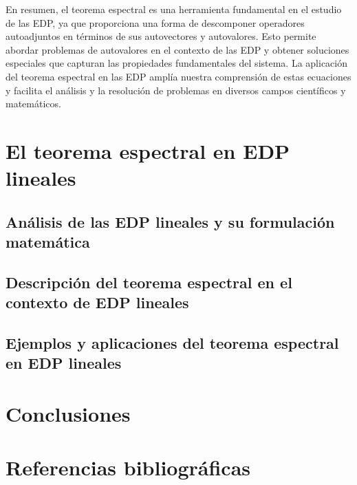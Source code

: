 \documentclass{article}
\begin{document}
    En resumen, el teorema espectral es una herramienta fundamental en el estudio de las EDP, ya que proporciona una forma de descomponer operadores autoadjuntos en términos de sus autovectores y autovalores. Esto permite abordar problemas de autovalores en el contexto de las EDP y obtener soluciones especiales que capturan las propiedades fundamentales del sistema. La aplicación del teorema espectral en las EDP amplía nuestra comprensión de estas ecuaciones y facilita el análisis y la resolución de problemas en diversos campos científicos y matemáticos.


\newpage

\section{El teorema espectral en EDP lineales}
    \subsection{Análisis de las EDP lineales y su formulación matemática}
    \subsection{Descripción del teorema espectral en el contexto de EDP lineales}
    \subsection{Ejemplos y aplicaciones del teorema espectral en EDP lineales}

\newpage

\section{Conclusiones}
\newpage

\section{Referencias bibliográficas}

\newpage
\end{document}
